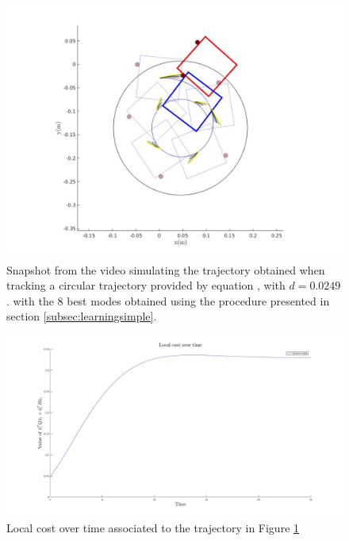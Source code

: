\documentclass[12,twoside]{TFG-GM}
\theoremstyle{definition}
\theoremstyle{remark}
\begin{document}
\begin{figure}[htb!]
\begin{center}
\includegraphics[width=16cm]{without_nominal_trajectory.jpg}
\end{center}
\caption{\label{fig:without_nominal_trajectory} \small Snapshot from the video simulating the trajectory obtained when tracking a circular trajectory provided by equation , with $d = 0.0249$. with the 8 best modes obtained using the procedure presented in section \ref{subsec:learningsimple}.}
\end{figure}

\begin{figure}[htb!]
\begin{center}
\includegraphics[width=16cm]{without_nominal_local_cost.jpg}
\end{center}
\caption{\label{fig:without_nominal_local_cost} \small Local cost over time associated to the trajectory in Figure \ref{fig:without_nominal_trajectory}}
\end{figure}
\end{document}
